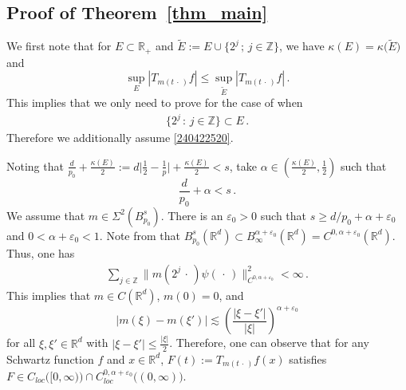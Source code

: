 \documentclass[11pt]{amsart}
\theoremstyle{plain}
\theoremstyle{definition}
\theoremstyle{remark}
\numberwithin{equation}{section}
\newcommand{\bR}{\mathbb{R}}
\newcommand{\bZ}{\mathbb{Z}}
\begin{document}
\subsection{Proof of Theorem~\ref{thm_main}}

We first note that for $E\subset \bR_+$ and 
$\widetilde{E}:=E\cup \{2^j\,;\,j\in\bZ\}$,
we have $\kappa(E)=\kappa\big(\widetilde{E}\big)$ and 
$$
\sup_{E}\left|T_{m(t\,\cdot\,)}f\right|\leq \sup_{\widetilde{E}}\left|T_{m(t\,\cdot\,)}f\right|\,.
$$
This implies that we only need to prove for the case of when
\begin{align}\label{240422520}
\{2^j\,:\,j\in\bZ\}\subset E\,.
\end{align}
Therefore we additionally assume \eqref{240422520}.


Noting that $\frac{d}{p_0}+\frac{\kappa(E)}{2}:=d\big|\frac{1}{2}-\frac{1}{p}\big|+\frac{\kappa(E)}{2}<s$, 
take $\alpha\in \left(\frac{\kappa(E)}{2},\frac{1}{2}\right)$ such that 
$$
\frac{d}{p_0}+\alpha<s\,.
$$
We assume that $m\in \Sigma^2(B_{p_0}^s)$.
There is an $\varepsilon_0>0$ such that $s \geq d/p_0 + \alpha +\varepsilon_0$ and $0<\alpha+\varepsilon_0<1$. 
Note from \cite[Theorem~2.8.1 (c)]{Tri1978} that $B_{p_0}^s(\bR^d)\subset B_\infty^{\alpha+\varepsilon_0}(\bR^d)=C^{0,\alpha+\varepsilon_0}(\bR^d)$.
Thus, one has
\begin{align}\label{2404171130}
\sum_{j\in\bZ}\|m(2^j\,\cdot\,)\widehat{\psi}(\,\cdot\,)\|_{C^{0,\alpha+\varepsilon_0}}^2<\infty\,.
\end{align}
This implies that $m\in C(\bR^d)$, $m(0)=0$, and
$$
|m(\xi)-m(\xi')|\lesssim \left(\frac{|\xi-\xi'|}{|\xi|}\right)^{\alpha+\varepsilon_0}
$$
for all $\xi,\xi'\in\bR^d$ with $|\xi-\xi'|\leq \frac{|\xi|}{2}$.
Therefore, one can observe that for any Schwartz function $f$ and $x\in\bR^d$, $F(t):=T_{m(t\,\cdot\,)}f(x)$ satisfies $F\in C_{loc}\big([0,\infty)\big)\cap C^{0,\alpha+\varepsilon_0}_{loc}\big((0,\infty)\big)$.
\end{document}
